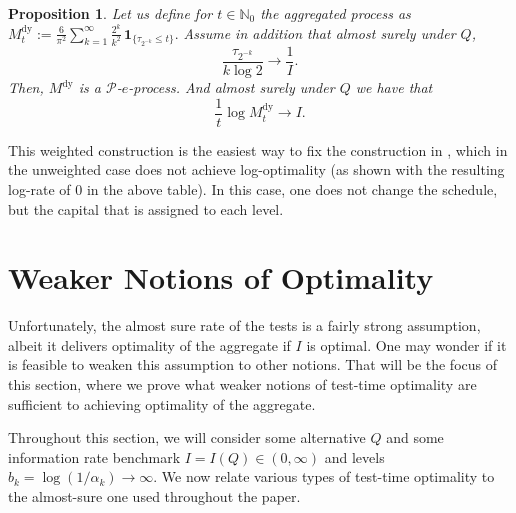 \documentclass{article}
\newcommand{\ind}[1]{\mathbf{1}_{\{#1\}}}
\newtheorem{proposition}[theorem]{Proposition}
\theoremstyle{definition}
\begin{document}
\begin{proposition}\label{prop:weighted-dyadic}
Let us define for $t\in\mathbb N_0$ the aggregated process as
\(
M_t^{\mathrm{dy}}:=\frac{6}{\pi^2} \sum_{k=1}^\infty \frac{2^k}{k^2}\,\ind{\tau_{2^{-k}}\le t}.
\)
Assume in addition that almost surely under $Q$,
\[
\frac{\tau_{2^{-k}}}{k\log 2}\longrightarrow \frac{1}{I}.
\]
Then, $M^{\mathrm{dy}}$ is a $\mathcal P$-$e$-process. And almost surely under $Q$ we have that
\[
\frac{1}{t}\log M_t^{\mathrm{dy}}\longrightarrow I.
\]
\end{proposition}

This weighted construction is the easiest way to fix the construction in \cite{ruf2023composite}, which in the unweighted case does not achieve log-optimality (as shown with the resulting log-rate of $0$ in the above table). In this case, one does not change the schedule, but the capital that is assigned to each level.

\section{Weaker Notions of Optimality}\label{sec:cutest}

Unfortunately, the almost sure rate of the tests is a fairly strong assumption, albeit it delivers optimality of the aggregate if $I$ is optimal. One may wonder if it is feasible to weaken this assumption to other notions. That will be the focus of this section, where we prove what weaker notions of test-time optimality are sufficient to achieving optimality of the aggregate. 

Throughout this section, we will consider some alternative $Q$ and some information rate benchmark $I=I(Q)\in(0,\infty)$ and levels $b_k=\log(1/\alpha_k)\to\infty$. We now relate various types of test-time optimality to the almost-sure one used throughout the paper.
\end{document}
